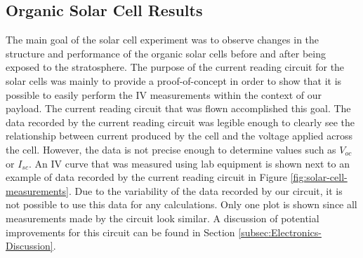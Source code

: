 \subsection{Organic Solar Cell Results}
\label{sec:Solar-Cell-Results}

The main goal of the solar cell experiment was to observe changes in the structure and performance of the organic solar cells before and after being exposed to the stratosphere.
The purpose of the current reading circuit for the solar cells was mainly to provide a proof-of-concept in order to show that it is possible to easily perform the IV measurements within the context of our payload.
The current reading circuit that was flown accomplished this goal.
The data recorded by the current reading circuit was legible enough to clearly see the relationship between current produced by the cell and the voltage applied across the cell.
However, the data is not precise enough to determine values such as $V_{oc}$ or $I_{sc}$.
An IV curve that was measured using lab equipment is shown next to an example of data recorded by the current reading circuit in Figure \ref{fig:solar-cell-measurements}. 
Due to the variability of the data recorded by our circuit, it is not possible to use this data for any calculations.
Only one plot is shown since all measurements made by the circuit look similar.
A discussion of potential improvements for this circuit can be found in Section \ref{subsec:Electronics-Discussion}.

